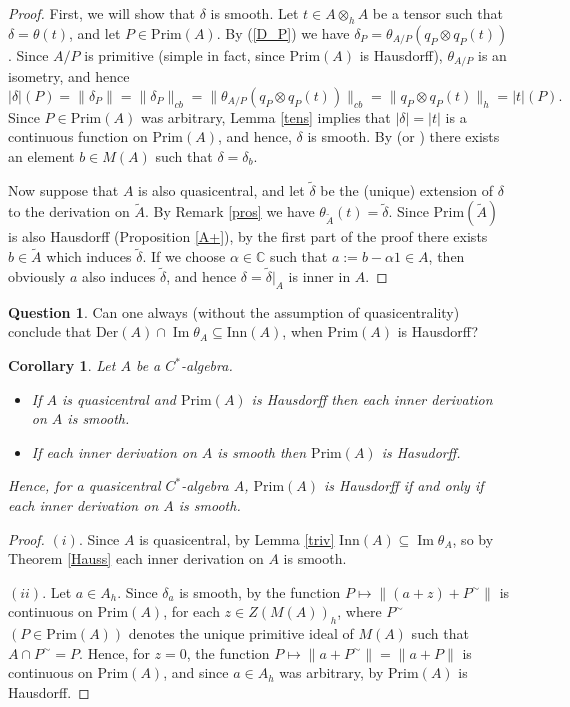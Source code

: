 \documentclass[]{amsart}
\newtheorem{corollary}[theorem]{Corollary}
\theoremstyle{remark}
\theoremstyle{definition}
\theoremstyle{question}
\newtheorem{question}[theorem]{Question}
\numberwithin{equation}{section}
\begin{document}
\begin{proof}
First, we will show that $\delta$  is smooth. Let
$t \in A \otimes_h A$ be a tensor such that $\delta= \theta(t)$, and let $P \in
\mathrm{Prim}(A)$. By (\ref{D_P}) we have $\delta_{P}=\theta_{A/P}(q_P \otimes
q_P(t))$. Since $A/P$ is primitive (simple in fact, since $\mathrm{Prim}(A)$ is
Hausdorff), $\theta_{A/P}$ is an isometry, and hence
$$|\delta|(P)=\|\delta_P\|=\|\delta_P\|_{cb}=\|\theta_{A/P}(q_P \otimes
q_P(t))\|_{cb}=\|q_P \otimes q_P(t)\|_h=|t|(P).$$
Since $P \in \mathrm{Prim}(A)$ was arbitrary, Lemma \ref{tens} implies
that $|\delta|=|t|$ is a continuous function on $\mathrm{Prim}(A)$, and hence,
$\delta$ is smooth. By \cite[2.4]{AEP} (or \cite[4.2.7]{Ara}) there exists an element $b \in M(A)$
such that $\delta=\delta_b$.

Now suppose that $A$ is also quasicentral, and let $\tilde{\delta}$ be
the (unique) extension of $\delta$ to the derivation on $\tilde{A}$. By Remark \ref{pros} we have $\theta_{\tilde{A}}(t)=\tilde{\delta}$.
Since $\mathrm{Prim}(\tilde{A})$ is also Hausdorff (Proposition \ref{A+}), by the first part of the
proof there exists $b \in \tilde{A}$ which induces $\tilde{\delta}$. If we
choose $\alpha \in {\mathbb{C}}$ such that $a:=b-\alpha 1 \in A$, then obviously $a$ also
induces $\tilde{\delta}$, and hence $\delta=\tilde{\delta}|_A$ is inner in $A$.
\end{proof}

\begin{question} Can one always (without the assumption of quasicentrality)
conclude that $\mathrm{Der}(A) \cap {\mathop{\mathrm{Im}}} \theta_A \subseteq \mathrm{Inn}(A)$, when
$\mathrm{Prim}(A)$ is Hausdorff?
\end{question}

\begin{corollary}\label{kar1} Let $A$ be a $C^*$-algebra.
\begin{itemize}
\item[(i)] If $A$ is quasicentral and $\mathrm{Prim}(A)$ is Hausdorff then each inner derivation on $A$ is smooth.
\item[(ii)] If each inner derivation on $A$ is smooth then $\mathrm{Prim}(A)$ is Hasudorff.
\end{itemize}
Hence, for a quasicentral $C^*$-algebra $A$, $\mathrm{Prim}(A)$ is Hausdorff if and only if each inner derivation on $A$ is smooth.
\end{corollary}
\begin{proof} $(i)$. Since $A$ is quasicentral, by Lemma \ref{triv} $\mathrm{Inn}(A) \subseteq {\mathop{\mathrm{Im}}} \theta_A$, so by Theorem \ref{Hauss} each inner derivation on $A$ is smooth.

$(ii)$. Let $a \in A_h$. Since $\delta_a$ is smooth, by \cite[2.10]{AEP} the function $P \mapsto \|(a+z)+P^{\sim}\|$ is continuous on $\mathrm{Prim}(A)$, for each $z \in Z(M(A))_h$, where $P^{\sim}$ $(P \in \mathrm{Prim}(A))$ denotes the unique primitive ideal of $M(A)$ such that $A \cap P^{\sim}=P$.  Hence, for
$z=0$, the function $P \mapsto \|a+P^\sim\|=\|a+P\|$ is continuous on $\mathrm{Prim}(A)$, and since $a\in A_h$ was arbitrary, by \cite[4.4.5]{Ped} $\mathrm{Prim}(A)$ is Hausdorff.
\end{proof}
\end{document}
